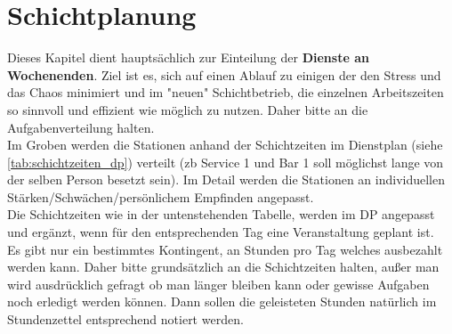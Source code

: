 \documentclass[a4paper,12pt]{article}
\begin{document}
\clearpage
\section{Schichtplanung}\label{sec:schichtplanung}
Dieses Kapitel dient hauptsächlich zur Einteilung der \textbf{Dienste an Wochenenden}. Ziel ist es, sich auf einen Ablauf zu einigen der den Stress und das Chaos minimiert und im "neuen" Schichtbetrieb, die einzelnen Arbeitszeiten so sinnvoll und effizient wie möglich zu nutzen. Daher bitte an die Aufgabenverteilung halten.\\

Im Groben werden die Stationen anhand der Schichtzeiten im Dienstplan (siehe \cref{tab:schichtzeiten_dp}) verteilt (zb Service 1 und Bar 1 soll möglichst lange von der selben Person besetzt sein). Im Detail werden die Stationen an individuellen Stärken/Schwächen/persönlichem Empfinden angepasst. \\

Die Schichtzeiten wie in der untenstehenden Tabelle, werden im DP angepasst und ergänzt, wenn für den entsprechenden Tag eine Veranstaltung geplant ist. \\

Es gibt nur ein bestimmtes Kontingent, an Stunden pro Tag welches ausbezahlt werden kann. Daher bitte grundsätzlich an die Schichtzeiten halten, außer man wird ausdrücklich gefragt ob man länger bleiben kann oder gewisse Aufgaben noch erledigt werden können. Dann sollen die geleisteten Stunden natürlich im Stundenzettel entsprechend notiert werden.

\vspace{1em}
\end{document}
